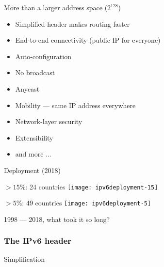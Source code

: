 \begin{frame}
  \begin{iblock}{More than a larger address space ($2^{128}$)}
    \begin{itemize}
    \item Simplified header makes routing faster
    \item End-to-end connectivity (public IP for everyone)
    \item Auto-configuration
    \item No broadcast
    \item Anycast
    \item Mobility --- same IP address everywhere
    \item Network-layer security
    \item Extensibility
    \item and more ...
    \end{itemize}
  \end{iblock}
\end{frame}

\begin{frame}{Deployment (2018)}
  \begin{minipage}{.48\linewidth}
    \begin{iblock}{\(>15\%\): 24 countries}
      \texttt{[image: ipv6deployment-15]}
    \end{iblock}
  \end{minipage}
  \begin{minipage}{.48\linewidth}
    \begin{iblock}{\(>5\%\): 49 countries}
      \texttt{[image: ipv6deployment-5]}
    \end{iblock}
  \end{minipage}
  \begin{refsection}
    \nocite{rfc2460} \printbibliography[heading=none]
  \end{refsection}
  1998 --- 2018, what took it so long?
\end{frame}

\subsubsection{The IPv6 header}

\begin{frame}{Simplification}
  \centering
  \mode<beamer>{ \texttt{[image: hdrs]} }%
\end{frame}

